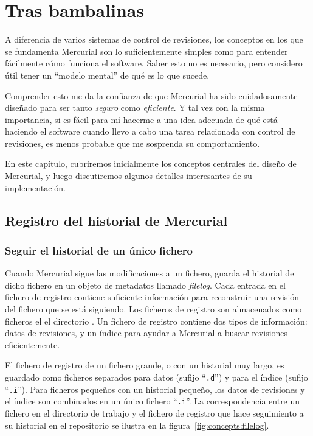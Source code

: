 \chapter{Tras bambalinas}
\label{chap:concepts}

A diferencia de varios sistemas de control de revisiones, los
conceptos en los que se fundamenta Mercurial son lo suficientemente
simples como para entender fácilmente cómo funciona el software. 
Saber esto no es necesario, pero considero útil tener un ``modelo
mental'' de qué es lo que sucede.

Comprender esto me da la confianza de que Mercurial ha sido
cuidadosamente diseñado para ser tanto \emph{seguro} como
\emph{eficiente}.  Y tal vez con la misma importancia, si es fácil
para mí hacerme a una idea adecuada de qué está haciendo el software
cuando llevo a cabo una tarea relacionada con control de revisiones,
es menos probable que me sosprenda su comportamiento.

En este capítulo, cubriremos inicialmente los conceptos centrales
del diseño de Mercurial, y luego discutiremos algunos detalles
interesantes de su implementación.

\section{Registro del historial de Mercurial}

\subsection{Seguir el historial de un único fichero}

Cuando Mercurial sigue las modificaciones a un fichero, guarda el
historial de dicho fichero en un objeto de metadatos llamado
\emph{filelog}.  Cada entrada en el fichero
de registro contiene suficiente información para reconstruir una
revisión del fichero que se está siguiendo. Los ficheros de registro
son almacenados como ficheros el el directorio
. Un fichero de registro contiene dos tipos
de información: datos de revisiones, y un índice para ayudar a
Mercurial a buscar revisiones eficientemente.

El fichero de registro de un fichero grande, o con un historial muy
largo, es guardado como ficheros separados para datos (sufijo
``\texttt{.d}'') y para el índice (sufijo ``\texttt{.i}''). Para
ficheros pequeños con un historial pequeño, los datos de revisiones y
el índice son combinados en un único fichero ``\texttt{.i}''. La
correspondencia entre un fichero en el directorio de trabajo y el
fichero de registro que hace seguimiento a su historial en el
repositorio se ilustra en la figura~\ref{fig:concepts:filelog}.

